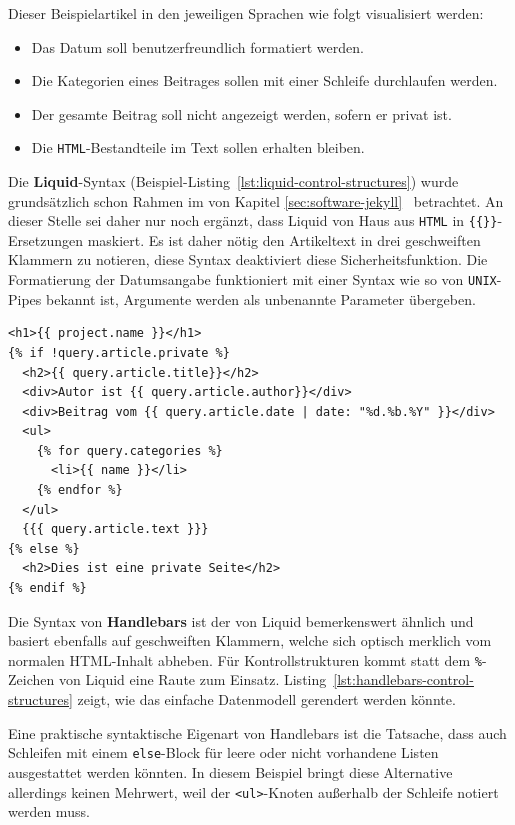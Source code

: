 Dieser Beispielartikel in den jeweiligen Sprachen wie folgt visualisiert werden:
\begin{itemize}[noitemsep]
\item Das Datum soll benutzerfreundlich formatiert werden.
\item Die Kategorien eines Beitrages sollen mit einer Schleife durchlaufen werden.
\item Der gesamte Beitrag soll nicht angezeigt werden, sofern er privat ist.
\item Die \texttt{HTML}-Bestandteile im Text sollen erhalten bleiben.
\end{itemize}

Die \textbf{Liquid}-Syntax (Beispiel-Listing~\ref{lst:liquid-control-structures}) wurde grundsätzlich schon Rahmen im von Kapitel \ref{sec:software-jekyll}~ betrachtet. An dieser Stelle sei daher nur noch ergänzt, dass Liquid von Haus aus \texttt{HTML} in \texttt{\{\{\}\}}-Ersetzungen maskiert. Es ist daher nötig den Artikeltext in drei geschweiften Klammern zu notieren, diese Syntax deaktiviert diese Sicherheitsfunktion. Die Formatierung der Datumsangabe funktioniert mit einer Syntax wie so von \texttt{UNIX}-Pipes bekannt ist, Argumente werden als unbenannte Parameter übergeben.

\begin{lstlisting}[float=h,caption={Blogartikel mit Liquid}, label={lst:liquid-control-structures}]
<h1>{{ project.name }}</h1>
{% if !query.article.private %}
  <h2>{{ query.article.title}}</h2>
  <div>Autor ist {{ query.article.author}}</div>
  <div>Beitrag vom {{ query.article.date | date: "%d.%b.%Y" }}</div>
  <ul>
    {% for query.categories %}
      <li>{{ name }}</li>
    {% endfor %}
  </ul>
  {{{ query.article.text }}}
{% else %}
  <h2>Dies ist eine private Seite</h2>
{% endif %}
\end{lstlisting}

Die Syntax von \textbf{Handlebars} ist der von Liquid bemerkenswert ähnlich und basiert ebenfalls auf geschweiften Klammern, welche sich optisch merklich vom normalen HTML-Inhalt abheben. Für Kontrollstrukturen kommt statt dem \texttt{\%}-Zeichen von Liquid eine Raute zum Einsatz. Listing~\ref{lst:handlebars-control-structures} zeigt, wie das einfache Datenmodell gerendert werden könnte.

Eine praktische syntaktische Eigenart von Handlebars ist die Tatsache, dass auch Schleifen mit einem \texttt{else}-Block für leere oder nicht vorhandene Listen ausgestattet werden könnten. In diesem Beispiel bringt diese Alternative allerdings keinen Mehrwert, weil der \texttt{<ul>}-Knoten außerhalb der Schleife notiert werden muss.

